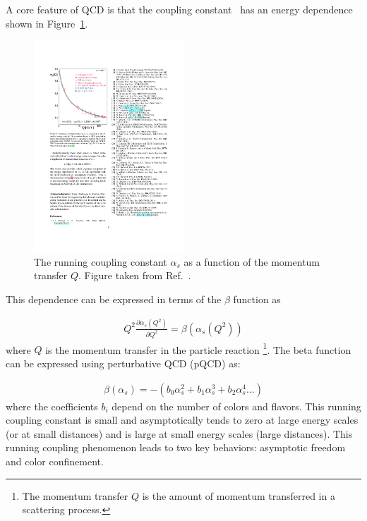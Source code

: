 A core feature of QCD is that the coupling constant \alphas\ has an energy dependence shown in Figure~\ref{fig:running_coupling}.

\begin{figure}[htbp]
\begin{center}
\includegraphics[width=0.5\textwidth]{figures/theory/running_coupling}
\caption{The running coupling constant $\alpha_s$ as a function of the momentum transfer $Q$.
Figure taken from Ref.~\cite{Beringer:1481544}.}
\label{fig:running_coupling}
\end{center}
\end{figure}

This dependence can be expressed in terms of the $\beta$ function as

\begin{align}
Q^2 \frac{\partial \alpha_s (Q^2)}{\partial Q^2} = \beta(\alpha_s (Q^2))
\end{align}
where $Q$ is the momentum transfer in the particle reaction
\footnote{The momentum transfer $Q$ is the amount of momentum transferred in a scattering process.}.
The beta function can be expressed using perturbative QCD (pQCD) as:

\begin{align}
\beta( \alpha_s ) = - (b_0 \alpha_s^2 + b_1 \alpha_s^3 + b_2 \alpha_s^4...)
\end{align}
where the coefficients $b_i$ depend on the number of colors and flavors.
This running coupling constant is small and asymptotically tends to zero at large energy scales (or at small distances) and is large at small energy scales (large distances).
This running coupling phenomenon leads to two key behaviors: asymptotic freedom and color confinement.


